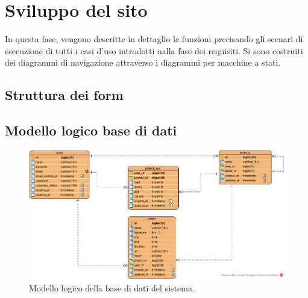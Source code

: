 
\chapter{Sviluppo del sito}\label{chap:sviluppo-sito}
In questa fase, vengono descritte in dettaglio le funzioni precisando gli 
scenari di esecuzione di tutti i casi d'uso introdotti nalla fase dei 
requisiti. Si sono costruiti dei diagrammi di navigazione attraverso i 
diagrammi per macchine a stati. 



\section{Struttura dei form}\label{sec:struttura-form}



\section{Modello logico base di dati}\label{sec:modello-logico}

\begin{figure}[H]
	\centering
	\caption{Modello logico della base di dati del sistema.}
	\label{fig:logical-diagram}
	\includegraphics[width=\textwidth]{images/logical-diagram}
\end{figure}

